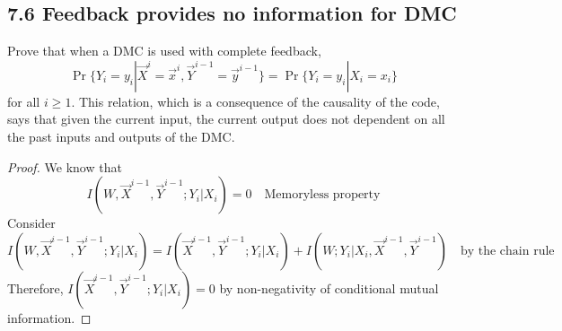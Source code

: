 \documentclass[../main.tex]{subfiles}
\begin{document}
\subsection*{7.6 Feedback provides no information for DMC} 
Prove that when a DMC is used with complete feedback, \[
\Pr\{Y_i=y_i|\vec X^i=\vec x^i, \vec Y^{i-1}=\vec y^{i-1}\}=\Pr\{Y_i=y_i|X_i=x_i\}
\] for all $i\geq 1$. This relation, which is a consequence of the causality of the code, says that given the current input, the current output does not dependent on all the past inputs and outputs of the DMC.
\begin{proof}
   We know that \[
   I(W,\vec X^{i-1}, \vec Y^{i-1}; Y_i|X_i)=0 \quad \text{Memoryless property}
   \]
 Consider \[
 I(W,\vec X^{i-1}, \vec Y^{i-1}; Y_i|X_i) = I(\vec X^{i-1}, \vec Y^{i-1};Y_i|X_i) + I(W;Y_i|X_i,\vec X^{i-1},\vec Y^{i-1}) \quad \text{by the chain rule}
 \]
 Therefore, $I(\vec X^{i-1}, \vec Y^{i-1};Y_i|X_i)=0$ by non-negativity of conditional mutual information.
\end{proof}
\end{document}
